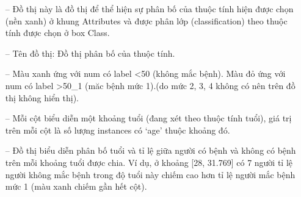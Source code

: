 \begin{itemize}
	\item[--]Đồ thị này là đồ thị để thể hiện sự phân bố của thuộc tính hiện được chọn (nền xanh) ở khung Attributes và được phân lớp (classification) theo thuộc tính được chọn ở box Class.
	\item[--]Tên đồ thị: Đồ thị phân bố của thuộc tính. 
	\item[--]Màu xanh ứng với num có label <50 (không mắc bệnh). Màu đỏ ứng với num có label >50\_1 (măc bệnh mức 1).(do mức 2, 3, 4 không có nên trên đồ thị không hiển thị).
	\item[--]Mỗi cột biểu diễn một khoảng tuổi (đang xét theo thuộc tính tuổi), giá trị trên mỗi cột là số lượng instances có ‘age’ thuộc khoảng đó.
	\item[--]Đồ thị biểu diễn phân bố tuổi và tỉ lệ giữa người có bệnh và không có bệnh trên mỗi khoảng tuổi được chia. Ví dụ, ở khoảng [28, 31.769] có 7 người tỉ lệ người không mắc bệnh trong độ tuổi này chiếm cao hơn tỉ lệ người mắc bệnh mức 1 (màu xanh chiếm gần hết cột).
\end{itemize}

